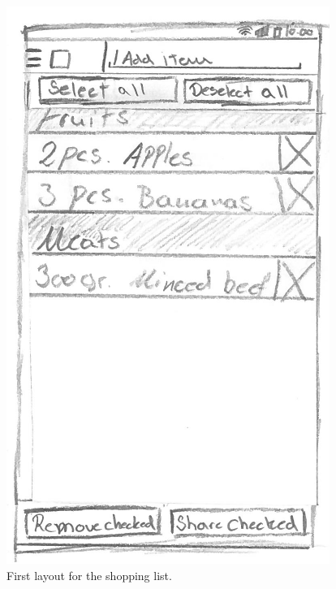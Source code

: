 \begin{figure}[H]
\begin{minipage}[b]{0.5\columnwidth}
\centering
\includegraphics[width=0.7\columnwidth]{img/prototypes/shopping_list_old.pdf}
\caption{First layout for the shopping list\label{fig:shoppingold}.}
\end{minipage}
\hspace{0.5cm}
\begin{minipage}[b]{0.5\columnwidth}
\centering

\end{minipage}
\end{figure}
